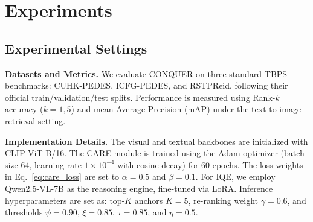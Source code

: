 \documentclass{article}
\begin{document}
\section{Experiments}


\subsection{Experimental Settings}
\noindent\textbf{Datasets and Metrics.}
We evaluate CONQUER on three standard TBPS benchmarks: CUHK-PEDES, ICFG-PEDES, and RSTPReid, following their official train/validation/test splits. 
Performance is measured using Rank-$k$ accuracy ($k=1,5$) and mean Average Precision (mAP) under the text-to-image retrieval setting.

\noindent\textbf{Implementation Details.}
The visual and textual backbones are initialized with CLIP ViT-B/16. 
The CARE module is trained using the Adam optimizer (batch size 64, learning rate $1\times10^{-4}$ with cosine decay) for 60 epochs. 
The loss weights in Eq.~\ref{eq:care_loss} are set to $\alpha=0.5$ and $\beta=0.1$. 
For IQE, we employ Qwen2.5-VL-7B as the reasoning engine, fine-tuned via LoRA. 
Inference hyperparameters are set as: top-$K$ anchors $K=5$, re-ranking weight $\gamma=0.6$, and thresholds $\psi=0.90$, $\xi=0.85$, $\tau=0.85$, and $\eta=0.5$.
\end{document}
